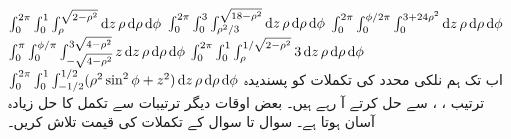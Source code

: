 $\int_{0}^{2\pi}\int_{0}^{1}\int_{\rho}^{\sqrt{2-\rho^2}} \dif z\,\rho \dif\rho\dif\phi $
$\int_{0}^{2\pi}\int_{0}^{3}\int_{\rho^2/3}^{\sqrt{18-\rho^2}} \dif z\,\rho \dif\rho\dif\phi $
$\int_{0}^{2\pi}\int_{0}^{\phi/2\pi}\int_{0}^{3+24\rho^2} \dif z\,\rho \dif\rho\dif\phi $
$\int_{0}^{\pi}\int_{0}^{\phi/\pi}\int_{-\sqrt{4-\rho^2}}^{3\sqrt{4-\rho^2}}z \dif z\,\rho \dif\rho\dif\phi $
$\int_{0}^{2\pi}\int_{0}^{1}\int_{\rho}^{1/\sqrt{2-\rho^2}}3 \dif z\,\rho \dif\rho\dif\phi $
$\int_{0}^{2\pi}\int_{0}^{1}\int_{-1/2}^{1/2}(\rho^2\sin^2\phi+z^2) \dif z\,\rho \dif\rho\dif\phi $
اب تک ہم  نلکی محدد کی تکملات  کو پسندیدہ  ترتیب  ، ،     سے حل کرتے آ رہے ہیں۔ بعض اوقات دیگر ترتیبات سے تکمل کا حل زیادہ آسان ہوتا ہے۔ سوال  تا سوال  کے تکملات کی قیمت تلاش کریں۔

